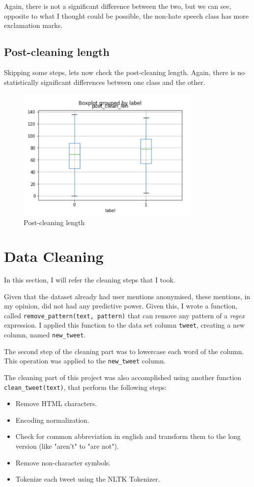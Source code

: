 \documentclass{article}
\begin{document}
	Again, there is not a significant difference between the two, but we can see, opposite to what I thought could be possible, the non-hate speech class has more exclamation marks. 
		
	\subsection{Post-cleaning length}
	
	Skipping some steps, lets now check the post-cleaning length. Again, there is no statistically  significant differences between one class and the other. 
	
	\begin{figure}[h]
		\label{Figure 3}
		\caption{Post-cleaning length}
		\includegraphics[width=9cm]{post.png}
		\centering
	\end{figure}

	\section{Data Cleaning}
	
	In this section, I will refer the cleaning steps that I took.
	
	Given that the dataset already had user mentions anonymised, these mentions, in my opinion, did not had any predictive power. Given this, I wrote a function, called \texttt{remove\_pattern(text, pattern)} that can remove any pattern of a \textit{regex} expression. I applied this function to the data set column \texttt{tweet}, creating a new column, named \texttt{new\_tweet}.
	
	The second step of the cleaning part was to lowercase each word of the column. This operation was applied to the \texttt{new\_tweet} column. 
	
	The cleaning part of this project was also accomplished using another function \texttt{clean\_tweet(text)}, that perform the following steps:
	\begin{itemize}
		\item Remove HTML characters.
		\item Encoding normalization.
		\item Check for common abbreviation in english and transform them to the long version (like "aren't" to "are not").
		\item Remove non-character symbols.
		\item Tokenize each tweet using the NLTK Tokenizer.
	\end{itemize}
	
\end{document}
